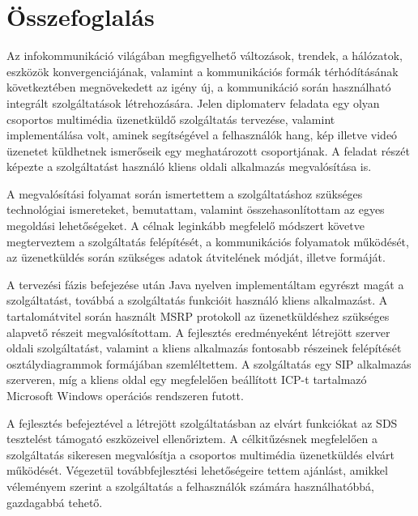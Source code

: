 
\section{Összefoglalás}
\label{sec:osszefoglalas}

Az infokommunikáció világában megfigyelhető változások, trendek, a hálózatok, eszközök konvergenciájának, valamint a kommunikációs formák térhódításának következtében megnövekedett az igény új, a kommunikáció során használható integrált szolgáltatások létrehozására. Jelen diplomaterv feladata egy olyan csoportos multimédia üzenetküldő szolgáltatás tervezése, valamint implementálása volt, aminek segítségével a felhasználók hang, kép illetve videó üzenetet küldhetnek ismerőseik egy meghatározott csoportjának. A feladat részét képezte a szolgáltatást használó kliens oldali alkalmazás megvalósítása is.

A megvalósítási folyamat során ismertettem a szolgáltatáshoz szükséges technológiai ismereteket, bemutattam, valamint összehasonlítottam az egyes megoldási lehetőségeket. A célnak leginkább megfelelő módszert követve megterveztem a szolgáltatás felépítését, a kommunikációs folyamatok működését, az üzenetküldés során szükséges adatok átvitelének módját, illetve formáját. 

A tervezési fázis befejezése után Java nyelven implementáltam egyrészt magát a szolgáltatást, továbbá a szolgáltatás funkcióit használó kliens alkalmazást. A tartalomátvitel során használt MSRP protokoll az üzenetküldéshez szükséges alapvető részeit megvalósítottam. A fejlesztés eredményeként létrejött szerver oldali szolgáltatást, valamint a kliens alkalmazás fontosabb részeinek felépítését osztálydiagrammok formájában szemléltettem. A szolgáltatás egy SIP alkalmazás szerveren, míg a kliens oldal egy megfelelően beállított ICP-t tartalmazó Microsoft Windows operációs rendszeren futott.

A fejlesztés befejeztével a létrejött szolgáltatásban az elvárt funkciókat az SDS tesztelést támogató eszközeivel ellenőriztem. A célkitűzésnek megfelelően a szolgáltatás sikeresen megvalósítja a csoportos multimédia üzenetküldés elvárt működését. Végezetül továbbfejlesztési lehetőségeire tettem ajánlást, amikkel véleményem szerint a szolgáltatás a felhasználók számára használhatóbbá, gazdagabbá tehető.
